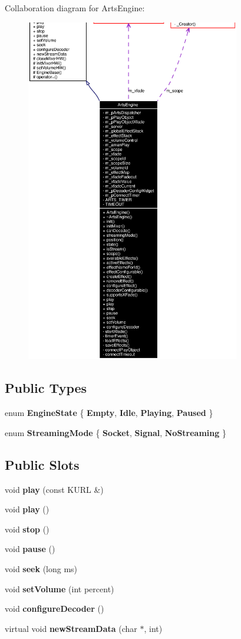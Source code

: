 Collaboration diagram for Arts\-Engine:\begin{figure}[H]
\begin{center}
\leavevmode
\includegraphics[width=265pt]{classArtsEngine__coll__graph}
\end{center}
\end{figure}
\subsection*{Public Types}
\begin{CompactItemize}
\item 
enum {\bf Engine\-State} \{ {\bf Empty}, 
{\bf Idle}, 
{\bf Playing}, 
{\bf Paused}
 \}
\item 
enum {\bf Streaming\-Mode} \{ {\bf Socket}, 
{\bf Signal}, 
{\bf No\-Streaming}
 \}
\end{CompactItemize}
\subsection*{Public Slots}
\begin{CompactItemize}
\item 
void {\bf play} (const KURL \&)
\item 
void {\bf play} ()
\item 
void {\bf stop} ()
\item 
void {\bf pause} ()
\item 
void {\bf seek} (long ms)
\item 
void {\bf set\-Volume} (int percent)
\item 
void {\bf configure\-Decoder} ()
\item 
virtual void {\bf new\-Stream\-Data} (char $\ast$, int)
\end{CompactItemize}
